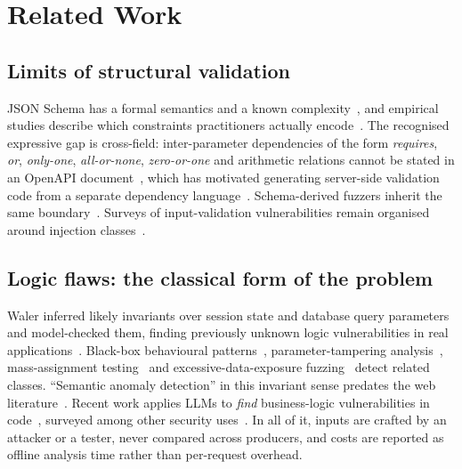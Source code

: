 \documentclass[conference]{IEEEtran}
\begin{document}
\section{Related Work}
\label{sec:related}

\subsection{Limits of structural validation}
JSON Schema has a formal semantics and a known complexity~\cite{pezoa2016foundations,attouche2023jsonschema},
and empirical studies describe which constraints practitioners actually
encode~\cite{baazizi2021usagenot}. The recognised expressive gap is cross-field: inter-parameter
dependencies of the form \emph{requires}, \emph{or}, \emph{only-one}, \emph{all-or-none},
\emph{zero-or-one} and arithmetic relations cannot be stated in an OpenAPI
document~\cite{martinlopez2022idl,martinlopez2019catalogue}, which has motivated generating
server-side validation code from a separate dependency
language~\cite{barakat2023idlgen}. Schema-derived fuzzers inherit the same
boundary~\cite{hatfielddodds2021schemathesis}. Surveys of input-validation vulnerabilities remain
organised around injection classes~\cite{fadlalla2023inputvalidation}.

\subsection{Logic flaws: the classical form of the problem}
Waler inferred likely invariants over session state and database query parameters and model-checked
them, finding previously unknown logic vulnerabilities in real
applications~\cite{felmetsger2010waler}. Black-box behavioural patterns~\cite{pellegrino2014logicflaws},
parameter-tampering analysis~\cite{bisht2010notamper}, mass-assignment
testing~\cite{corradini2023massassignment} and excessive-data-exposure
fuzzing~\cite{pan2024edefuzz} detect related classes. ``Semantic anomaly detection'' in this
invariant sense predates the web literature~\cite{raz2002semanticanomaly}. Recent work applies LLMs
to \emph{find} business-logic vulnerabilities in code~\cite{metin2025blv,armillotta2026antaeus},
surveyed among other security uses~\cite{sheng2025llmsecsurvey}. In all of it, inputs are crafted by
an attacker or a tester, never compared across producers, and costs are reported as offline analysis
time rather than per-request overhead.
\end{document}
